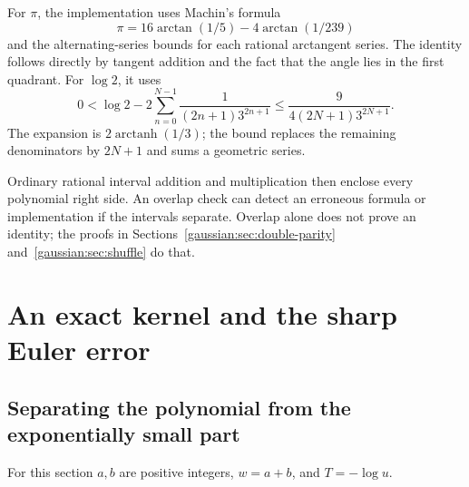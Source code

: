 For $\pi$, the implementation uses Machin's formula
\[
 \pi=16\arctan(1/5)-4\arctan(1/239)
\]
and the alternating-series bounds for each rational arctangent series. The identity follows directly by tangent addition and the fact that the angle lies in the first quadrant. For $\log2$, it uses
\begin{equation}\label{signed:eq:log2-bound}
 0<\log2-2\sum_{n=0}^{N-1}\frac1{(2n+1)3^{2n+1}}
 \le\frac9{4(2N+1)3^{2N+1}}.
\end{equation}
The expansion is $2\operatorname{arctanh}(1/3)$; the bound replaces the remaining denominators by $2N+1$ and sums a geometric series.

Ordinary rational interval addition and multiplication then enclose every polynomial right side. An overlap check can detect an erroneous formula or implementation if the intervals separate. Overlap alone does not prove an identity; the proofs in Sections~\ref{gaussian:sec:double-parity} and~\ref{gaussian:sec:shuffle} do that.



\section{An exact kernel and the sharp Euler error}
\label{signed:sec:sharp-error}

\subsection{Separating the polynomial from the exponentially small part}
For this section $a,b$ are positive integers, $w=a+b$, and $T=-\log u$.


